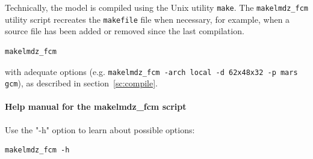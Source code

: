 \label{sc:compil1}
Technically, the model is compiled using the Unix utility {\tt make}.
The {\tt makelmdz\_fcm} utility script recreates the {\tt makefile} file
when necessary, for example, when a source file has been added or removed
since the last compilation.

\begin{verbatim}
makelmdz_fcm
\end{verbatim}
with adequate options (e.g.
{\tt makelmdz\_fcm -arch local -d 62x48x32 -p mars gcm}), as
described in section~\ref{sc:compile}.


\paragraph{Help manual for the makelmdz\_fcm script}
Use the "-h" option to learn about possible options:
\begin{verbatim}
makelmdz_fcm -h
\end{verbatim}
%
